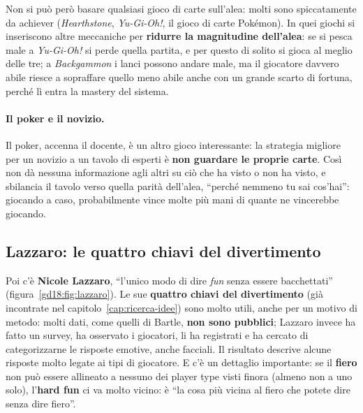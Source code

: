 Non si può però basare qualsiasi gioco di carte sull'alea: molti sono spiccatamente
da achiever (\emph{Hearthstone}, \emph{Yu-Gi-Oh!}, il gioco di carte Pokémon). In
quei giochi si inseriscono altre meccaniche per \textbf{ridurre la magnitudine
dell'alea}: se si pesca male a \emph{Yu-Gi-Oh!} si perde quella partita, e per questo
di solito si gioca al meglio delle tre; a \emph{Backgammon} i lanci possono andare
male, ma il giocatore davvero abile riesce a sopraffare quello meno abile anche con
un grande scarto di fortuna, perché lì entra la mastery del sistema.

\paragraph{Il poker e il novizio.} Il poker, accenna il docente, è un altro gioco
interessante: la strategia migliore per un novizio a un tavolo di esperti è
\textbf{non guardare le proprie carte}. Così non dà nessuna informazione agli altri
su ciò che ha visto o non ha visto, e sbilancia il tavolo verso quella parità
dell'alea, ``perché nemmeno tu sai cos'hai'': giocando a caso, probabilmente vince
molte più mani di quante ne vincerebbe giocando.


\subsection{Lazzaro: le quattro chiavi del divertimento}

Poi c'è \textbf{Nicole Lazzaro}, ``l'unico modo di dire \emph{fun} senza essere
bacchettati'' (figura~\ref{gd18:fig:lazzaro}). Le sue \textbf{quattro chiavi del
divertimento} (già incontrate nel capitolo~\ref{cap:ricerca-idee}) sono molto utili,
anche per un motivo di metodo: molti dati, come quelli di Bartle, \textbf{non sono
pubblici}; Lazzaro invece ha fatto un survey, ha osservato i giocatori, li ha
registrati e ha cercato di categorizzarne le risposte emotive, anche facciali. Il
risultato descrive alcune risposte molto legate ai tipi di giocatore. E c'è un
dettaglio importante: se il \textbf{fiero} non può essere allineato a nessuno dei
player type visti finora (almeno non a uno solo), l'\textbf{hard fun} ci va molto
vicino: è ``la cosa più vicina al fiero che potete dire senza dire fiero''.

